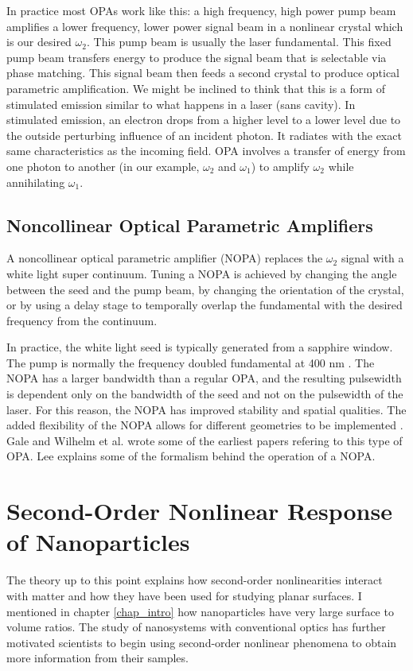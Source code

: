 In practice most OPAs work like this: a high frequency, high power pump beam amplifies a lower frequency, lower power signal beam in a nonlinear crystal which is our desired $\omega_{2}$. This pump beam is usually the laser fundamental. This fixed pump beam transfers energy to produce the signal beam that is selectable via phase matching. This signal beam then feeds a second crystal to produce optical parametric amplification. We might be inclined to think that this is a form of stimulated emission similar to what happens in a laser (sans cavity). In stimulated emission, an electron drops from a higher level to a lower level due to the outside perturbing influence of an incident photon. It radiates with the exact same characteristics as the incoming field. OPA involves a transfer of energy from one photon to another (in our example, $\omega_{2}$ and $\omega_{1}$) to amplify $\omega_{2}$ while annihilating $\omega_{1}$.

\subsection{Noncollinear Optical Parametric Amplifiers}\label{chap_theory_nopa}
A noncollinear optical parametric amplifier (NOPA) replaces the $\omega_{2}$ signal with a white light super continuum. Tuning a NOPA is achieved by changing the angle between the seed and the pump beam, by changing the orientation of the crystal, or by using a delay stage to temporally overlap the fundamental with the desired frequency from the continuum.

In practice, the white light seed is typically generated from a sapphire window. The pump is normally the frequency doubled fundamental at 400 nm \cite{huber2001noncollinear, PhysRevB.84.165316}. The NOPA has a larger bandwidth than a regular OPA, and the resulting pulsewidth is dependent only on the bandwidth of the seed and not on the pulsewidth of the laser. For this reason, the NOPA has improved stability and spatial qualities. The added flexibility of the NOPA allows for different geometries to be implemented \cite{bodnar2010dual}. Gale \cite{gale1995sub} and Wilhelm et al. \cite{wilhelm1997sub} wrote some of the earliest papers refering to this type of OPA. Lee \cite{leecascaded} explains some of the formalism behind the operation of a NOPA.

\section{Second-Order Nonlinear Response of Nanoparticles}\label{chap_theory_nps}
The theory up to this point explains how second-order nonlinearities interact with matter and how they have been used for studying planar surfaces. I mentioned in chapter \ref{chap_intro} how nanoparticles have very large surface to volume ratios. The study of nanosystems with conventional optics has further motivated scientists to begin using second-order nonlinear phenomena to obtain more information from their samples.

